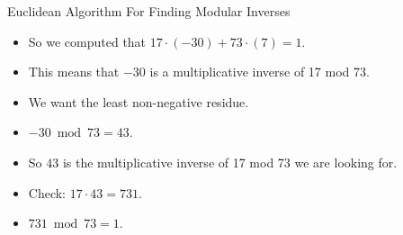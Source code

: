 \documentclass{beamer}
\begin{document}
\begin{frame}{Euclidean Algorithm For Finding Modular Inverses}
\begin{itemize}
  \item So we computed that $17\cdot (-30) + 73\cdot(7) = 1$.
  \item This means that $-30$ is a multiplicative inverse of 17 mod 73.
  \item We want the least non-negative residue.
  \item $-30 \bmod 73 = 43$.
  \item So $43$ is the multiplicative inverse of 17 mod 73 we are looking for.
  \item Check: $17\cdot 43 = 731$.
  \item $731 \bmod  73  = 1$.
\end{itemize}
\end{frame}
\end{document}
